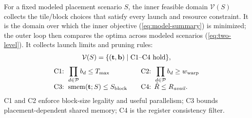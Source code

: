 For a fixed modeled placement scenario \(S\), the inner feasible domain \(\mathcal{V}(S)\) collects the tile/block choices that satisfy every launch and resource constraint. It is the domain over which the inner objective (\autoref{eq:model-summary}) is minimized; the outer loop then compares the optima across modeled scenarios (\autoref{eq:two-level}). It collects launch limits and pruning rules:
\begin{equation}
\begin{gathered}
\mathcal{V}(S)
= \{(\tvec,\mathbf{b}) \mid \text{C1--C4 hold}\},\\[0.6ex]
\begin{array}{@{}l@{\qquad}l@{}}
\text{C1: } \displaystyle \prod_{d\in\mathcal{P}} b_d \le \Tmax
&
\text{C2: } \displaystyle \prod_{d\in\mathcal{P}} b_d \ge \Wwarp\\[0.7ex]
\text{C3: } \operatorname{smem}(\tvec;S)\le \Sblock
&
\text{C4: } \hat{R}\le R_{\mathit{avail}}.
\end{array}
\end{gathered}
\label{eq:feasible-domain}
\end{equation}
C1 and C2 enforce block-size legality and useful parallelism; C3 bounds placement-dependent shared memory; C4 is the register consistency filter.

